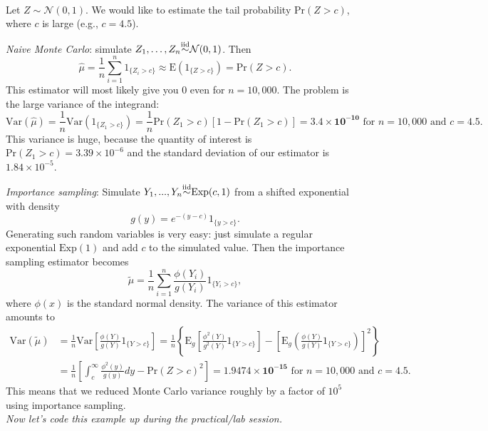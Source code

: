 \documentclass[11pt]{article}\usepackage[]{graphicx}\usepackage[]{color}
\numberwithin{algorithm}{section}
\newcommand{\indfun}[1]{\ensuremath{1_{\{#1\}}}}
\theoremstyle{remark}
\theoremstyle{definition}
\newenvironment{example}[1]{\begin{trivlist}
\item[\hskip \labelsep {\bfseries Example}: \underline{#1}]\ \\}{\end{trivlist}}
\begin{document}
\begin{example}{Estimating the tail of the standard normal distribution}
  Let $Z \sim \mathcal{N}(0,1)$. We would like to estimate the tail probability 
  $\text{Pr}(Z > c)$, where $c$ is large (e.g., $c = 4.5$).  
  \par
  \textit{Naive Monte Carlo}: simulate $Z_1,\dots,Z_n {\buildrel \text{iid} \over \sim} \mathcal{N}(0,1)$.
  Then 
  \begin{equation*}
    \hat{\mu} = \frac{1}{n} \sum_{i=1}^n 1_{\{Z_i>c\}} \approx 
   \text{E}\left(1_{\{Z>c\}}\right) = \text{Pr}(Z>c). 
  \end{equation*}
  This estimator will most likely give you 0 even for $n = 10,000$.  
  The problem is the large variance of the integrand:
  \begin{equation*}
    \text{Var}(\hat{\mu}) = \frac{1}{n}\text{Var}(\indfun{Z_1 > c}) 
    = \frac{1}{n}\text{Pr}(Z_1 > c)[1 - \text{Pr}(Z_1 > c)] = \mathbf{3.4\times10^{-10}} \text{ for } n=10,000 
    \text{ and } c=4.5. 
  \end{equation*}
  This variance is huge, because the quantity of interest is $\text{Pr}(Z_1 > c) = 3.39\times 10^{-6}$ and the standard
  deviation of our estimator is $1.84\times10^{-5}$.
  \par
  \textit{Importance sampling}: Simulate $Y_1,...,Y_n {\buildrel \text{iid} \over \sim} \text{Exp}(c, 1)$ 
  from a shifted exponential with density
  \begin{equation*}
    g(y) = e^{-(y-c)}1_{\{y > c\}}.
  \end{equation*}
  Generating such random variables is very easy: just simulate a regular exponential $\text{Exp}(1)$ and
  add $c$ to the simulated value. Then the importance sampling estimator becomes
  \begin{equation*}
    \tilde{\mu} = \frac{1}{n} \sum_{i=1}^n \frac{\phi(Y_i)}{g(Y_i)} \indfun{Y_i > c},
  \end{equation*}
  where $\phi(x)$ is the standard normal density. The variance of this estimator amounts to 
  \begin{equation*}
    \begin{split}
      \text{Var}(\tilde{\mu}) &= \frac{1}{n} \text{Var}\left[ 
        \frac{\phi(Y)}{g(Y)}1_{\{Y > c\}}\right] = 
      \frac{1}{n}\left\{\text{E}_g\left[\frac{\phi^2(Y)}{g^2(Y)}1_{\{Y > c\}}\right] 
        - \left[\text{E}_g\left(\frac{\phi(Y)}{g(Y)}1_{\{Y > c\}}\right)\right]^2\right\} \\ 
      &=\frac{1}{n}\left[\int_c^\infty \frac{\phi^2(y)}{g(y)}dy - \text{Pr}(Z > c)^2\right] 
      = \mathbf{1.9474\times 10^{-15}} \text{ for } n=10,000 \text{ and } c=4.5.
    \end{split}
  \end{equation*}
  This means that we reduced Monte Carlo variance roughly by a factor of $10^5$ using importance 
  sampling.\\
  \textit{Now let's code this example up during the practical/lab session.}
\end{example}
\end{document}
